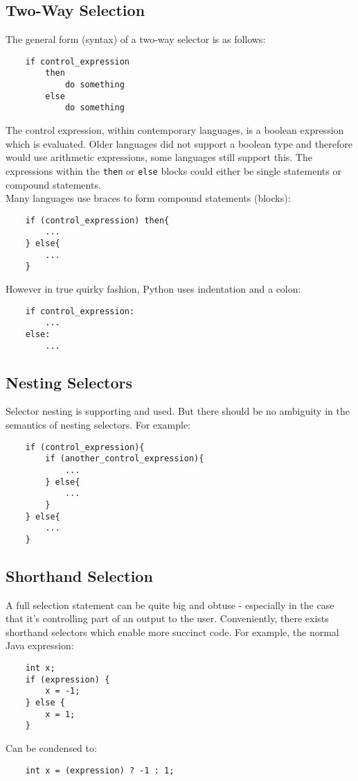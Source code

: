 \subsection{Two-Way Selection}
The general form (syntax) of a two-way selector is as follows:
\begin{verbatim}
    if control_expression
        then
            do something
        else
            do something
\end{verbatim}
The control expression, within contemporary languages, is a boolean expression which is evaluated. Older languages did not support a boolean type and therefore would use arithmetic expressions, some languages still support this. The expressions within the \verb|then| or \verb|else| blocks could either be single statements or compound statements.\\

Many languages use braces to form compound statements (blocks):
\begin{verbatim}
    if (control_expression) then{
        ...
    } else{
        ...
    }
\end{verbatim}

However in true quirky fashion, Python uses indentation and a colon:
\begin{verbatim}
    if control_expression:
        ...
    else:
        ...
\end{verbatim}

\subsection{Nesting Selectors}
Selector nesting is supporting and used. But there should be no ambiguity in the semantics of nesting selectors. For example:
\begin{verbatim}
    if (control_expression){
        if (another_control_expression){
            ...
        } else{
            ...
        }
    } else{
        ...
    }
\end{verbatim}

\subsection{Shorthand Selection}
A full selection statement can be quite big and obtuse - especially in the case that it's controlling part of an output to the user. Conveniently, there exists shorthand selectors which enable more succinct code. For example, the normal Java expression:
\begin{verbatim}
    int x;
    if (expression) {
        x = -1;
    } else {
        x = 1;
    }
\end{verbatim}
Can be condensed to:
\begin{verbatim}
    int x = (expression) ? -1 : 1;
\end{verbatim}

